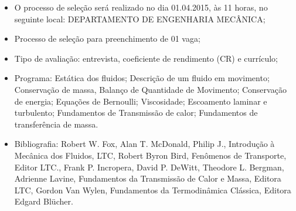 \documentclass[a4paper,portuguese,10pt]{article}
\begin{document}
\begin{itemize}
	\item O processo de seleção será realizado no dia 01.04.2015, às 11
	horas, no seguinte local: DEPARTAMENTO DE ENGENHARIA MECÂNICA;
	\item Processo de seleção para preenchimento de 01 vaga;
	\item Tipo de avaliação: entrevista, coeficiente de rendimento (CR)
	e currículo;
	\item Programa: Estática dos fluidos; Descrição de um fluido em
	movimento; Conservação de massa, Balanço de Quantidade de Movimento;
	Conservação de energia; Equações de Bernoulli; Viscosidade;
	Escoamento laminar e turbulento; Fundamentos de Transmissão de
	calor; Fundamentos de transferência de massa.
	\item Bibliografia: Robert W. Fox, Alan T. McDonald, Philip J.,
	Introdução à Mecânica dos Fluidos, LTC, Robert Byron Bird, Fenômenos
	de Transporte, Editor LTC., Frank P. Incropera, David P. DeWitt,
	Theodore L. Bergman, Adrienne Lavine, Fundamentos da Transmissão de
	Calor e Massa, Editora LTC, Gordon Van Wylen, Fundamentos da
	Termodinâmica Clássica, Editora Edgard Blücher.
\end{itemize}
\end{document}
